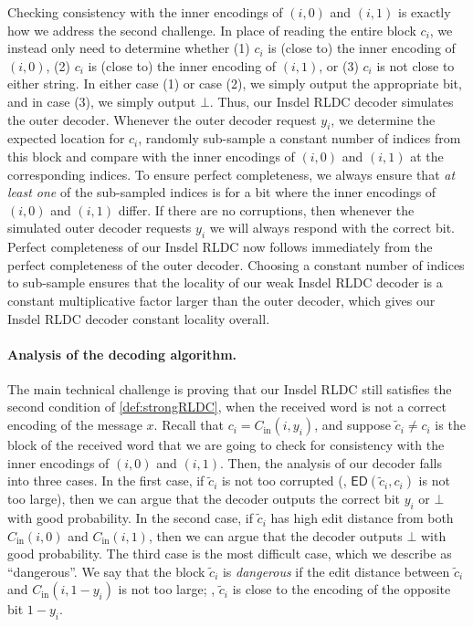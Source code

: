\documentclass[10pt,a4paper]{article}
\theoremstyle{remark}
\newcommand{\ie}{\text{i.e.}\xspace}
\newcommand{\ED}{\ensuremath{\mathsf{ED}}\xspace}%
\newcommand{\tildec}{\ensuremath{\widetilde{c}}\xspace}
\newcommand{\Cin}{C_{\text{in}}}
\begin{document}
Checking consistency with the inner encodings of $(i,0)$ and $(i,1)$ is exactly how we address the second challenge.
In place of reading the entire block $c_i$, we instead only need to determine whether (1) $c_i$ is (close to) the inner encoding of $(i,0)$, (2) $c_i$ is (close to) the inner encoding of $(i,1)$, or (3) $c_i$ is not close to either string.
In either case (1) or case (2), we simply output the appropriate bit, and in case (3), we simply output $\bot$.
Thus, our Insdel RLDC decoder simulates the outer decoder. 
Whenever the outer decoder request $y_i$, we determine the expected location for $c_i$, randomly sub-sample a constant number of indices from this block and compare with the inner encodings of $(i,0)$ and $(i,1)$ at the corresponding indices. 
To ensure perfect completeness, we always ensure that {\em at least one} of the sub-sampled indices is for a bit where the inner encodings of $(i,0)$ and $(i,1)$ differ. 
If there are no corruptions, then whenever the simulated outer decoder requests $y_i$ we will always respond with the correct bit. 
Perfect completeness of our Insdel RLDC now follows immediately from the perfect completeness of the outer decoder. 
Choosing a constant number of indices to sub-sample ensures that the locality of our weak Insdel RLDC decoder is a constant multiplicative factor larger than the outer decoder, which gives our Insdel RLDC decoder constant locality overall.

\paragraph{Analysis of the decoding algorithm.} 
The main technical challenge is proving that our Insdel RLDC still satisfies the second condition of \cref{def:strongRLDC}, when the received word is not a correct encoding of the message $x$. 
Recall that $c_i = \Cin(i,y_i)$, and suppose $\tildec_i \neq c_i$ is the block of the received word that we are going to check for consistency with the inner encodings of $(i,0)$ and $(i,1)$.
Then, the analysis of our decoder falls into three cases.
In the first case, if $\tildec_i$ is not too corrupted (\ie, $\ED(\tildec_i, c_i)$ is not too large), then we can argue that the decoder outputs the correct bit $y_i$ or $\bot$ with good probability.
In the second case, if $\tildec_i$ has high edit distance from both $\Cin(i,0)$ and $\Cin(i,1)$, then we can argue that the decoder outputs $\bot$ with good probability.
The third case is the most difficult case, which we describe as ``dangerous''. 
We say that the block $\tildec_i$ is \emph{dangerous} if the edit distance between $\tildec_i$ and $\Cin(i,1-y_i)$ is not too large; \ie, $\tildec_i$ is close to the encoding of the opposite bit $1-y_i$.
\end{document}
